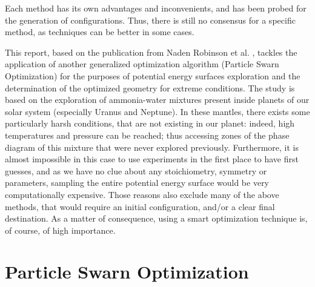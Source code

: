 \documentclass[11pt]{article}
\begin{document}
\begin{multicols}{2}
Each method has its own advantages and inconvenients, and has been probed for the generation of configurations. Thus, there is still no consensus for a specific method, as techniques can be better in some cases. \vspace{1em}

This report, based on the publication from Naden Robinson et al. \cite{original}, tackles the application of another generalized optimization algorithm (Particle Swarn Optimization) for the purposes of potential energy surfaces exploration and the determination of the optimized geometry for extreme conditions. The study is based on the exploration of ammonia-water mixtures present inside planets of our solar system (especially Uranus and Neptune). In these mantles, there exists some particularly harsh conditions, that are not existing in our planet: indeed, high temperatures and pressure can be reached; thus accessing zones of the phase diagram of this mixture that were never explored previously. Furthermore, it is almost impossible in this case to use experiments in the first place to have first guesses, and as we have no clue about any stoichiometry, symmetry or parameters, sampling the entire potential energy surface would be very computationally expensive. Those reasons also exclude many of the above methods, that would require an initial configuration, and/or a clear final destination. As a matter of consequence, using a smart optimization technique is, of course, of high importance.

\section*{Particle Swarn Optimization}

\end{multicols}
\end{document}
